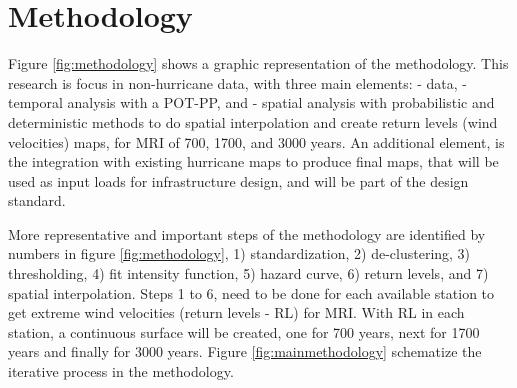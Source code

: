 \documentclass[12pt,oneside]{reedthesis}
\begin{document}
\hypertarget{rmd-method}{%
\chapter{Methodology}\label{rmd-method}}

Figure \ref{fig:methodology} shows a graphic representation of the methodology. This research is focus in non-hurricane data, with three main elements: - data, - temporal analysis with a POT-PP, and - spatial analysis with probabilistic and deterministic methods to do spatial interpolation and create return levels (wind velocities) maps, for MRI of 700, 1700, and 3000 years. An additional element, is the integration with existing hurricane maps to produce final maps, that will be used as input loads for infrastructure design, and will be part of the design standard.

More representative and important steps of the methodology are identified by numbers in figure \ref{fig:methodology}, 1) standardization, 2) de-clustering, 3) thresholding, 4) fit intensity function, 5) hazard curve, 6) return levels, and 7) spatial interpolation. Steps 1 to 6, need to be done for each available station to get extreme wind velocities (return levels - RL) for MRI. With RL in each station, a continuous surface will be created, one for 700 years, next for 1700 years and finally for 3000 years. Figure \ref{fig:mainmethodology} schematize the iterative process in the methodology.
\end{document}
